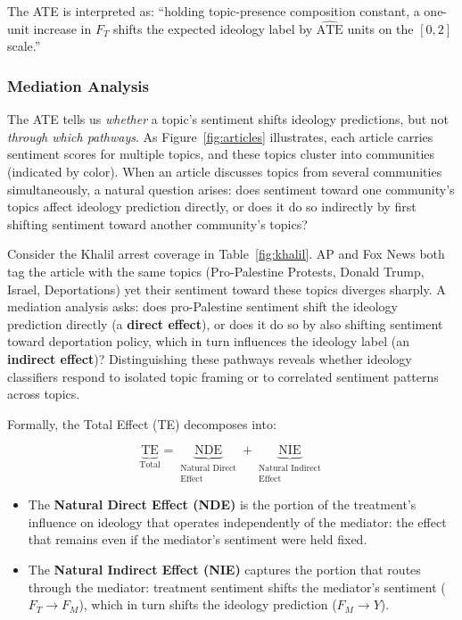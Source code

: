The ATE is interpreted as: ``holding topic-presence composition constant, a one-unit increase in $F_T$ shifts the expected ideology label by $\widehat{\text{ATE}}$ units on the $[0,2]$ scale.''

\subsubsection{Mediation Analysis}
\label{sec:mediation-design}

The ATE tells us \emph{whether} a topic's sentiment shifts ideology predictions, but not \emph{through which pathways}. As Figure~\ref{fig:articles} illustrates, each article carries sentiment scores for multiple topics, and these topics cluster into communities (indicated by color). When an article discusses topics from several communities simultaneously, a natural question arises: does sentiment toward one community's topics affect ideology prediction directly, or does it do so indirectly by first shifting sentiment toward another community's topics?

Consider the Khalil arrest coverage in Table~\ref{fig:khalil}. AP and Fox News both tag the article with the same topics (Pro-Palestine Protests, Donald Trump, Israel, Deportations) yet their sentiment toward these topics diverges sharply. A mediation analysis asks: does pro-Palestine sentiment shift the ideology prediction directly (a \textbf{direct effect}), or does it do so by also shifting sentiment toward deportation policy, which in turn influences the ideology label (an \textbf{indirect effect})? Distinguishing these pathways reveals whether ideology classifiers respond to isolated topic framing or to correlated sentiment patterns across topics.

Formally, the Total Effect (TE) decomposes into:

\begin{equation}
  \underbrace{\text{TE}}_{\text{Total}} =
  \underbrace{\text{NDE}}_{\substack{\text{Natural Direct}\\ \text{Effect}}} +
  \underbrace{\text{NIE}}_{\substack{\text{Natural Indirect}\\ \text{Effect}}}
\end{equation}

\begin{itemize}
  \item The \textbf{Natural Direct Effect (NDE)} is the portion of the treatment's influence on ideology that operates independently of the mediator: the effect that remains even if the mediator's sentiment were held fixed.
  \item The \textbf{Natural Indirect Effect (NIE)} captures the portion that routes through the mediator: treatment sentiment shifts the mediator's sentiment ($F_T \to F_M$), which in turn shifts the ideology prediction ($F_M \to Y$).
\end{itemize}

